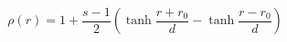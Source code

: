 \begin{equation}\label{eq:poussins_init_rho_ball}
  \rho(r) = 1 + \frac{s - 1}{2} \left(
    \tanh\frac{r + r_0}{d} - \tanh\frac{r - r_0}{d}
  \right)
\end{equation}
